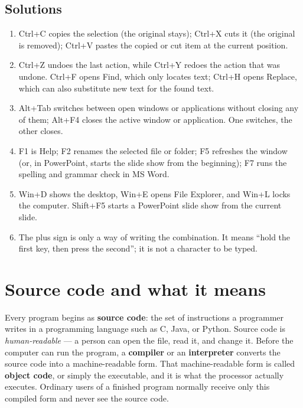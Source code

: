 \subsection*{Solutions}
\begingroup\small
\begin{enumerate}[label=\arabic*.]
  \item Ctrl+C copies the selection (the original stays); Ctrl+X cuts it (the
    original is removed); Ctrl+V pastes the copied or cut item at the current
    position.
  \item Ctrl+Z undoes the last action, while Ctrl+Y redoes the action that was
    undone. Ctrl+F opens Find, which only locates text; Ctrl+H opens Replace,
    which can also substitute new text for the found text.
  \item Alt+Tab switches between open windows or applications without closing
    any of them; Alt+F4 closes the active window or application. One switches,
    the other closes.
  \item F1 is Help; F2 renames the selected file or folder; F5 refreshes the
    window (or, in PowerPoint, starts the slide show from the beginning); F7
    runs the spelling and grammar check in MS Word.
  \item Win+D shows the desktop, Win+E opens File Explorer, and Win+L locks
    the computer. Shift+F5 starts a PowerPoint slide show from the current
    slide.
  \item The plus sign is only a way of writing the combination. It means
    ``hold the first key, then press the second''; it is not a character to be
    typed.
\end{enumerate}
\endgroup

\section{Source code and what it means}
Every program begins as \textbf{source code}: the set of instructions a
programmer writes in a programming language such as C, Java, or Python. Source
code is \emph{human-readable} --- a person can open the file, read it, and
change it. Before the computer can run the program, a \textbf{compiler} or an
\textbf{interpreter} converts the source code into a machine-readable form.
That machine-readable form is called \textbf{object code}, or simply the
executable, and it is what the processor actually executes. Ordinary users of
a finished program normally receive only this compiled form and never see the
source code.

